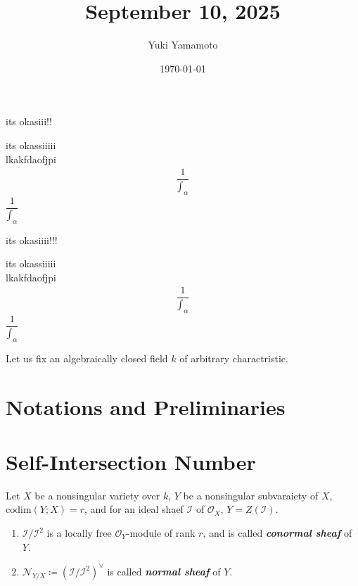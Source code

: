 \documentclass[a4paper, eqnumbering=section, thmnumbering=section, 10pt]{simple-eng}
\title{September 10, 2025}
\author{Yuki Yamamoto}
\date{\today}
\begin{document}
\maketitle
\tableofcontents

\newpage
\begin{myproof}
    its okasiii!!
\end{myproof}
\begin{myproof}
    its okassiiiii\\
    lkakfdaofjpi
    \begin{align}
        \dfrac{1}{\int_{\alpha}}
    \end{align}
    $\dfrac{1}{\int_{\alpha}}$
\end{myproof}
\begin{definition}{}{}
    its okasiiii!!!
\end{definition}
\begin{definition}
    its okassiiiii\\
    lkakfdaofjpi
    \begin{align}
        \dfrac{1}{\int_{\alpha}}
    \end{align}
    $\dfrac{1}{\int_{\alpha}}$
\end{definition}

\newpage
Let us fix an algebraically closed field $k$ of arbitrary charactristic.

\setcounter{section}{-1}
\section{Notations and Preliminaries}



\section{Self-Intersection Number}

\begin{definition}{}{}
    Let $X$ be a nonsingular variety over $k$, $Y$ be a nonsingular subvaraiety of $X$, 
    $\textrm{codim}(Y;X)=r$, and for an ideal shaef $\mathscr{I}$ of $\mathscr{O}_X$, 
    $Y=Z(\mathscr{I})$. 
    \begin{enumerate}[label=(\arabic*{})]
        \item $\mathscr{I}/\mathscr{I}^2$ is a locally free $\mathscr{O}_Y$-module of rank $r$, 
            and is called \textit{\textbf{conormal sheaf}} of $Y$.
        \item $\mathscr{N}_{Y/X} \coloneqq (\mathscr{I}/\mathscr{I}^{2})^{\vee }$ is 
            called \textbf{\textit{normal sheaf} }of $Y$.
    \end{enumerate}
\end{definition}
\end{document}
